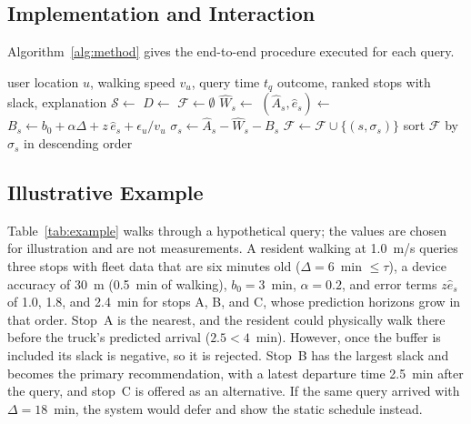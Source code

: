 \subsection{Implementation and Interaction}
Algorithm~\ref{alg:method} gives the end-to-end procedure executed for each query.

\begin{algorithm}[t]
\caption{Advise-or-Defer Departure Recommendation}
\label{alg:method}
\begin{algorithmic}[1]
\Require user location $u$, walking speed $v_u$, query time $t_q$
\Ensure outcome, ranked stops with slack, explanation
\State $\mathcal{S} \gets$ 
\State $D \gets$ 
  \State \Return {}
\EndIf
\State $\mathcal{F} \gets \emptyset$
  \State $\hat{W}_s \gets$ 
  \State $(\hat{A}_s, \hat{e}_s) \gets$ 
  \State $B_s \gets b_0 + \alpha\Delta + z\,\hat{e}_s + \epsilon_u / v_u$
  \State $\sigma_s \gets \hat{A}_s - \hat{W}_s - B_s$
   \State $\mathcal{F} \gets \mathcal{F} \cup \{(s,\sigma_s)\}$ \EndIf
\EndFor
{}
  \State \Return {}
\EndIf
\State sort $\mathcal{F}$ by $\sigma_s$ in descending order
\State \Return {}
\end{algorithmic}
\end{algorithm}

\subsection{Illustrative Example}
Table~\ref{tab:example} walks through a hypothetical query; the values are chosen for illustration and are not measurements. A resident walking at 1.0~m/s queries three stops with fleet data that are six minutes old ($\Delta = 6$~min $\le \tau$), a device accuracy of 30~m (0.5~min of walking), $b_0 = 3$~min, $\alpha = 0.2$, and error terms $z\hat{e}_s$ of 1.0, 1.8, and 2.4~min for stops A, B, and C, whose prediction horizons grow in that order. Stop~A is the nearest, and the resident could physically walk there before the truck's predicted arrival ($2.5 < 4$~min). However, once the buffer is included its slack is negative, so it is rejected. Stop~B has the largest slack and becomes the primary recommendation, with a latest departure time 2.5~min after the query, and stop~C is offered as an alternative. If the same query arrived with $\Delta = 18$~min, the system would defer and show the static schedule instead.

